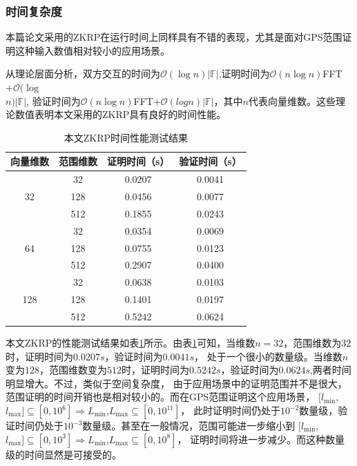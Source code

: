 \documentclass[zihao=-4]{ctexart}
\begin{document}
\subsubsection{时间复杂度}
本篇论文采用的ZKRP在运行时间上同样具有不错的表现，尤其是面对GPS范围证明这种输入数值相对较小的应用场景。\par
从理论层面分析，双方交互的时间为$\mathcal{O}(\log n)|\mathbb{F}|$,证明时间为$\mathcal{O}(n\log n)$FFT$+\mathcal{O}(\log$\\$ n)|\mathbb{F}|$,
验证时间为$\mathcal{O}(n\log n)$FFT$+\mathcal{O}(logn)|\mathbb{F}|$，其中$n$代表向量维数。这些理论数值表明本文采用的ZKRP具有良好的时间性能。\par
\begin{table}[H] %
  \centering
  \caption{本文ZKRP时间性能测试结果}
  \begin{tabular}{|c|c|c|c|}\hline
      向量维数 &  范围维数 & 证明时间（s） & 验证时间（s）\\ \hline
       \multirow{3}{*}{32} & 32 & 0.0207 & 0.0041 \\ \cline{2-4}
       \multirow{3}{*}{} & 128 & 0.0456 & 0.0077 \\  \cline{2-4}
       \multirow{3}{*}{} & 512 & 0.1855 & 0.0243\\ \hline
       \multirow{3}{*}{64} & 32 & 0.0354 & 0.0069 \\ \cline{2-4}
       \multirow{3}{*}{} & 128 & 0.0755 & 0.0123 \\  \cline{2-4}
       \multirow{3}{*}{} & 512 & 0.2907 & 0.0400 \\ \hline
       \multirow{3}{*}{128} & 32 & 0.0638 & 0.0103 \\ \cline{2-4}
       \multirow{3}{*}{} & 128 & 0.1401 & 0.0197 \\  \cline{2-4}
       \multirow{3}{*}{} & 512 & 0.5242 & 0.0624 \\ \hline
  \end{tabular}
  \label{时间性能}
\end{table}
本文ZKRP的性能测试结果如表\ref{时间性能}所示。由表\ref{时间性能}可知，当维数$n=32$，范围维数为$32$时，证明时间为$0.0207s$，验证时间为$0.0041s$，
处于一个很小的数量级。当维数$n$变为$128$，范围维数变为$512$时，证明时间为$0.5242s$，验证时间为$0.0624s$,两者时间明显增大。不过，类似于空间复杂度，
由于应用场景中的证明范围并不是很大，范围证明的时间开销也是相对较小的。而在GPS范围证明这个应用场景，
$[l_{\min}$,$l_{\max}]\subseteq[0, 10^6]\Rightarrow L_{\min}$,$L_{\max}\subseteq[0, 10^{11}]$，
此时证明时间仍处于$10^{-2}$数量级，验证时间仍处于$10^{-3}$数量级。甚至在一般情况，范围可能进一步缩小到
$[l_{\min}$,$l_{\max}]\subseteq[0, 10^3]\Rightarrow L_{\min}$,$L_{\max}\subseteq[0, 10^8]$，
证明时间将进一步减少。而这种数量级的时间显然是可接受的。
\end{document}
